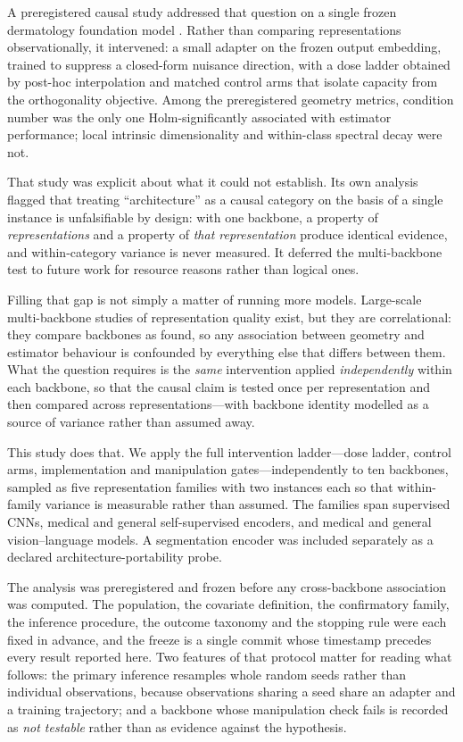 \documentclass[11pt,a4paper]{article}
\begin{document}
A preregistered causal study addressed that question on a single frozen
dermatology foundation model \cite{paper4}. Rather than comparing representations
observationally, it intervened: a small adapter on the frozen output embedding,
trained to suppress a closed-form nuisance direction, with a dose ladder obtained
by post-hoc interpolation and matched control arms that isolate capacity from the
orthogonality objective. Among the preregistered geometry metrics, condition
number was the only one Holm-significantly associated with estimator performance;
local intrinsic dimensionality and within-class spectral decay were not.

That study was explicit about what it could not establish. Its own analysis
flagged that treating ``architecture'' as a causal category on the basis of a
single instance is unfalsifiable by design: with one backbone, a property of
\emph{representations} and a property of \emph{that representation} produce
identical evidence, and within-category variance is never measured. It deferred
the multi-backbone test to future work for resource reasons rather than logical
ones.

Filling that gap is not simply a matter of running more models. Large-scale
multi-backbone studies of representation quality exist, but they are
correlational: they compare backbones as found, so any association between
geometry and estimator behaviour is confounded by everything else that differs
between them. What the question requires is the \emph{same} intervention applied
\emph{independently} within each backbone, so that the causal claim is tested
once per representation and then compared across representations---with backbone
identity modelled as a source of variance rather than assumed away.

This study does that. We apply the full intervention ladder---dose ladder,
control arms, implementation and manipulation gates---independently to ten
backbones, sampled as five representation families with two instances each so
that within-family variance is measurable rather than assumed. The families span
supervised CNNs, medical and general self-supervised encoders, and medical and
general vision--language models. A segmentation encoder was included separately
as a declared architecture-portability probe.

The analysis was preregistered and frozen before any cross-backbone association
was computed. The population, the covariate definition, the confirmatory family,
the inference procedure, the outcome taxonomy and the stopping rule were each
fixed in advance, and the freeze is a single commit whose timestamp precedes
every result reported here. Two features of that protocol matter for reading what
follows: the primary inference resamples whole random seeds rather than
individual observations, because observations sharing a seed share an adapter and
a training trajectory; and a backbone whose manipulation check fails is recorded
as \emph{not testable} rather than as evidence against the hypothesis.
\end{document}

